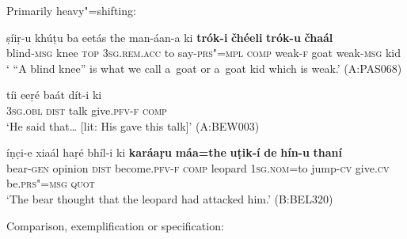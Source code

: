  Primarily heavy"=shifting:

\begin{exe}
\ex
\label{ex:13-228}
\gll ṣíiṛ-u khúṭu ba eetás the  man-áan-a ki \textbf{trók-i} \textbf{čhéeli} \textbf{trók-u} \textbf{čhaál} \\
blind-\textsc{msg} knee \textsc{top} \textsc{3sg.rem.acc} to say-\textsc{prs"=mpl} \textsc{comp} weak-\textsc{f} goat weak-\textsc{msg} kid \\
\glt ` ``A blind knee'' is what we call a~goat or a~goat kid which is weak.' (A:PAS068)

\ex
\label{ex:13-229}
\gll tíi eeṛé baát dít-i ki  \\
\textsc{3sg.obl} \textsc{dist} talk give.\textsc{pfv-f} \textsc{comp}  \\
\glt `He said that{\ldots} [lit: His gave this talk]' (A:BEW003)

\ex
\label{ex:13-230}
\gll íṇc̣i-e xiaál haṛé bhíl-i  ki \textbf{karáaṛu} \textbf{máa=the} \textbf{uṭik-í} \textbf{de} \textbf{hín-u} \textbf{thaní} \\
bear-\textsc{gen} opinion \textsc{dist} become.\textsc{pfv-f} \textsc{comp} leopard \textsc{1sg.nom=}to jump-\textsc{cv} give.\textsc{cv} be.\textsc{prs"=msg} \textsc{quot} \\
\glt `The bear thought that the leopard had attacked him.' (B:BEL320) 
\end{exe}

 Comparison, exemplification or specification:

